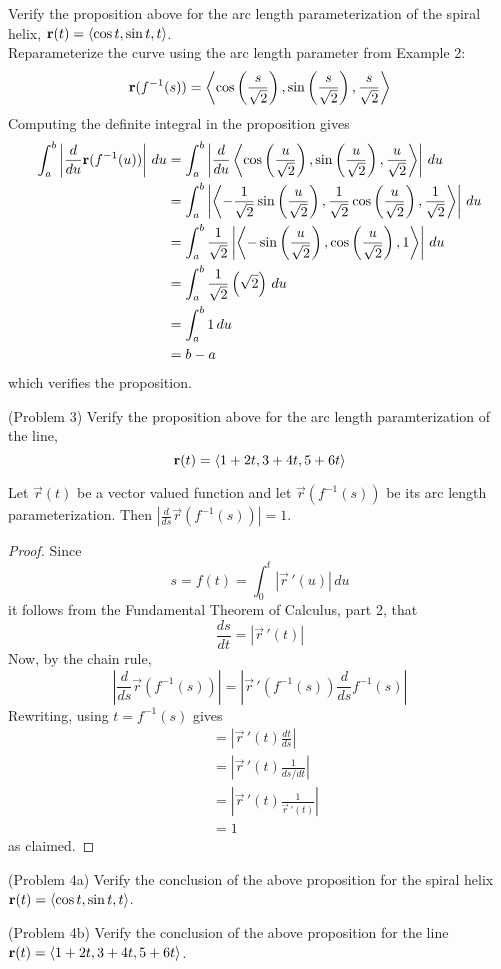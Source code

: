 \documentclass[handout]{ximera}
\begin{document}
\begin{example}[Example 3]
Verify the proposition above for the arc length parameterization of the spiral helix, $\mathbf r(t) = \left\langle \cos t, \sin t, t\right\rangle$.\\ 
Reparameterize the curve using the arc length parameter from Example 2:
\[
\mathbf r(f^{-1}(s)) = \left\langle \cos \left(\frac{s}{\sqrt 2}\right), \sin \left(\frac{s}{\sqrt 2}\right),\frac{s}{\sqrt 2}\right\rangle
\]
Computing the definite integral in the proposition gives
\begin{align*}
\int_a^b \left| \frac{d}{du} \mathbf r(f^{-1}(u))\right| \, du &= \int_a^b \left| \frac{d}{du} \left\langle \cos \left(\frac{u}{\sqrt 2}\right), \sin \left(\frac{u}{\sqrt 2}\right),\frac{u}{\sqrt 2}\right\rangle\right|\, du\\
&= \int_a^b \left| \left\langle  -\frac{1}{\sqrt 2} \sin\left(\frac{u}{\sqrt 2}\right), \frac{1}{\sqrt 2} \cos\left(\frac{u}{\sqrt 2}\right), \frac{1}{\sqrt 2}\right\rangle\right|\, du\\
&= \int_a^b \frac{1}{\sqrt 2} \left|\left\langle -\sin\left(\frac{u}{\sqrt 2}\right),\cos\left(\frac{u}{\sqrt 2}\right),1\right\rangle \right|\, du\\
&= \int_a^b \frac{1}{\sqrt 2} \left(\sqrt 2\right) \, du\\
&= \int_a^b 1 \, du\\
&= b - a
\end{align*}
which verifies the proposition.
\end{example}

\begin{problem}(Problem 3)
Verify the proposition above for the arc length paramterization of the line, 
\[
\mathbf r(t) = \left\langle 1 + 2t, 3+4t, 5+6t\right\rangle
\]
\end{problem}


\begin{proposition}
Let $\vec r(t)$ be a vector valued function and let $\vec r(f^{-1}(s))$ be its arc length parameterization.
Then $\left| \frac{d}{ds} \vec r(f^{-1}(s))\right| = 1$.\\
\end{proposition}
\begin{proof}
Since 
\[
s = f(t) = \int_0^t |\vec r \,'(u)|\, du
\]
it follows from the Fundamental Theorem of Calculus, part 2, that
\[
\frac{ds}{dt} = |\vec r \,'(t)|
\]
Now, by the chain rule,
\[
 \left| \frac{d}{ds} \vec r(f^{-1}(s)) \right| = \left|\vec r\,'(f^{-1}(s)) \frac{d}{ds} f^{-1}(s)\right|
 \]
 Rewriting, using $t = f^{-1}(s)$ gives
 \begin{align*}
 &= \left|\vec r\,'(t) \frac{dt}{ds} \right|\\
 &= \left|\vec r\,'(t) \frac{1}{ds/dt} \right|\\
 &=\left|\vec r\,'(t) \frac{1}{\vec r\,'(t)} \right| \\
 &= 1
\end{align*}
as claimed.
\end{proof}

\begin{problem}(Problem 4a)
Verify the conclusion of the above proposition for the spiral helix $\mathbf r(t) = \left\langle \cos t, \sin t, t\right\rangle$.
\end{problem}

\begin{problem}(Problem 4b)
Verify the conclusion of the above proposition for the line $\mathbf r(t) = \left\langle 1+2t, 3+4t, 5+6t\right\rangle$.
\end{problem}
\end{document}
